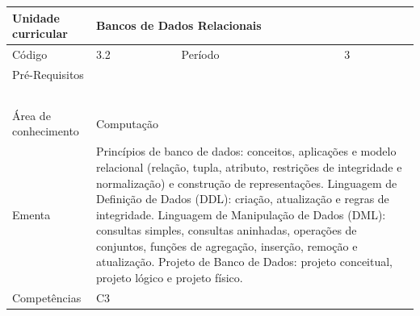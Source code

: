 \clearpage
\newpage

\begin{quadro}[ht!]
  \centering\scriptsize
\caption{Unidade Curricular Bancos de Dados Relacionais}

\begin{tabular}{|p{2.5cm}|p{2.5cm}|p{2.5cm}|p{2.5cm}|p{2.5cm}|}\hline

  Unidade curricular & \multicolumn{4}{p{10cm}|}{ Bancos de Dados Relacionais }\\\hline
  Código & 3.2 & Período & \multicolumn{2}{p{5cm}|}{ 3 }\\\hline
  Pré-Requisitos & \multicolumn{4}{p{10cm}|}{  } \\\hline
  \cellcolor{blue1}{ CH PRESENCIAL } &
    \cellcolor{blue1}{CH EAD Síncrona} &
    \cellcolor{blue1}{CH EAD Síncrona Mediada} &
    \cellcolor{blue1}{CH EAD Assíncrona} &
    \cellcolor{blue1}{CH APCC} \\\hline
  \cellcolor{blue1}{ 60 } &
    \cellcolor{blue1}{ 0 } &
    \cellcolor{blue1}{ 0 } &
    \cellcolor{blue1}{ 0 } &
    \cellcolor{blue1}{0} \\\hline
  \cellcolor{blue1}{ CH Teórica } &
    \cellcolor{blue1}{CH Prática} &
    \cellcolor{blue1}{CH Humanidades} &
    \cellcolor{blue1}{CH Extensão} &
    \cellcolor{blue1}{CH EAD TOTAL} \\\hline
  \cellcolor{blue1}{ 30 } &
    \cellcolor{blue1}{ 30 } &
    \cellcolor{blue1}{ 0 } &
    \cellcolor{blue1}{ 0 } &
    \cellcolor{blue1}{ 0 } \\\hline
  \cellcolor{blue1}{CARGA-HORÁRIA TOTAL} & \multicolumn{4}{p{10cm}|}{ \cellcolor{blue1}{ 60 } } \\\hline
  Área de conhecimento & \multicolumn{4}{p{10cm}|}{ Computação } \\\hline
  Ementa & \multicolumn{4}{p{10cm}|}{ Princípios de banco de dados: conceitos, aplicações e modelo relacional (relação, tupla, atributo, restrições de integridade e normalização) e construção de representações. Linguagem de Definição de Dados (DDL): criação, atualização e regras de integridade. Linguagem de Manipulação de Dados (DML): consultas simples, consultas aninhadas, operações de conjuntos, funções de agregação, inserção, remoção e atualização. Projeto de Banco de Dados: projeto conceitual, projeto lógico e projeto físico. } \\\hline
  Competências & \multicolumn{4}{p{10cm}|}{ C3 } \\\hline


  
	\end{tabular}

\end{quadro}


